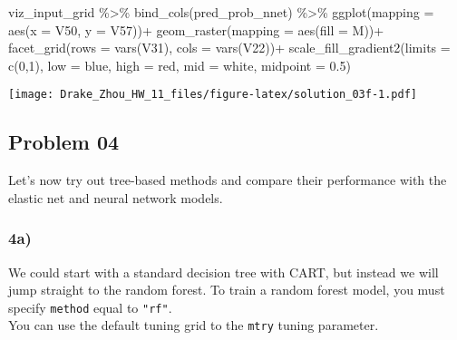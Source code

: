 \documentclass[
]{article}
\newenvironment{Shaded}{\begin{snugshade}}{\end{snugshade}}
\newcommand{\AttributeTok}[1]{\textcolor[rgb]{0.77,0.63,0.00}{#1}}
\newcommand{\DecValTok}[1]{\textcolor[rgb]{0.00,0.00,0.81}{#1}}
\newcommand{\FloatTok}[1]{\textcolor[rgb]{0.00,0.00,0.81}{#1}}
\newcommand{\FunctionTok}[1]{\textcolor[rgb]{0.00,0.00,0.00}{#1}}
\newcommand{\NormalTok}[1]{#1}
\newcommand{\SpecialCharTok}[1]{\textcolor[rgb]{0.00,0.00,0.00}{#1}}
\newcommand{\StringTok}[1]{\textcolor[rgb]{0.31,0.60,0.02}{#1}}
\begin{document}
\begin{Shaded}
\begin{Highlighting}[]
\NormalTok{viz\_input\_grid }\SpecialCharTok{\%\textgreater{}\%}
  \FunctionTok{bind\_cols}\NormalTok{(pred\_prob\_nnet) }\SpecialCharTok{\%\textgreater{}\%}
  \FunctionTok{ggplot}\NormalTok{(}\AttributeTok{mapping =} \FunctionTok{aes}\NormalTok{(}\AttributeTok{x =}\NormalTok{ V50, }\AttributeTok{y =}\NormalTok{ V57))}\SpecialCharTok{+}
  \FunctionTok{geom\_raster}\NormalTok{(}\AttributeTok{mapping =} \FunctionTok{aes}\NormalTok{(}\AttributeTok{fill =}\NormalTok{ M))}\SpecialCharTok{+}
  \FunctionTok{facet\_grid}\NormalTok{(}\AttributeTok{rows =} \FunctionTok{vars}\NormalTok{(V31), }\AttributeTok{cols =} \FunctionTok{vars}\NormalTok{(V22))}\SpecialCharTok{+}
  \FunctionTok{scale\_fill\_gradient2}\NormalTok{(}\AttributeTok{limits =} \FunctionTok{c}\NormalTok{(}\DecValTok{0}\NormalTok{,}\DecValTok{1}\NormalTok{), }
                       \AttributeTok{low =} \StringTok{\textquotesingle{}blue\textquotesingle{}}\NormalTok{, }
                       \AttributeTok{high =} \StringTok{\textquotesingle{}red\textquotesingle{}}\NormalTok{, }
                       \AttributeTok{mid =} \StringTok{\textquotesingle{}white\textquotesingle{}}\NormalTok{, }
                       \AttributeTok{midpoint =} \FloatTok{0.5}\NormalTok{)}
\end{Highlighting}
\end{Shaded}

\texttt{[image: Drake\_Zhou\_HW\_11\_files/figure-latex/solution\_03f-1.pdf]}

\hypertarget{problem-04}{%
\subsection{Problem 04}\label{problem-04}}

Let's now try out tree-based methods and compare their performance with
the elastic net and neural network models.

\hypertarget{a-3}{%
\subsubsection{4a)}\label{a-3}}

We could start with a standard decision tree with CART, but instead we
will jump straight to the random forest. To train a random forest model,
you must specify \texttt{method} equal to \texttt{"rf"}.\\
You can use the default tuning grid to the \texttt{mtry} tuning
parameter.
\end{document}

